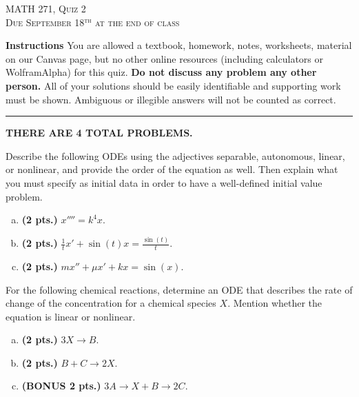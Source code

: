 \documentclass[12pt]{amsbook}
\begin{document}

\begin{center}
   \textsc{\large MATH 271, Quiz 2}\\
   \textsc{Due September 18$^\textrm{th}$ at the end of class}
\end{center}

\vspace{1cm}

\noindent\textbf{Instructions} \; You are allowed a textbook, homework, notes, worksheets, material on our Canvas page, but no other online resources (including calculators or WolframAlpha) for this quiz.  \textbf{Do not discuss any problem any other person.} All of your solutions should be easily identifiable and supporting work must be shown.  Ambiguous or illegible answers will not be counted as correct.


\vspace*{.5cm}
\hrule
\vspace*{.5cm}

\begin{center}\textbf{\large THERE ARE 4 TOTAL PROBLEMS.}\normalsize \end{center}

\begin{problem}
Describe the following ODEs using the adjectives separable, autonomous, linear, or nonlinear, and provide the order of the equation as well. Then explain what you must specify as initial data in order to have a well-defined initial value problem.
\begin{enumerate}[(a)]
	\item \textbf{(2 pts.)} $x'''' = k^4 x$.
	\item \textbf{(2 pts.)} $\frac{1}{t} x' + \sin(t) x = \frac{\sin(t)}{t}$.
	\item \textbf{(2 pts.)} $mx''+\mu x' + kx = \sin(x)$.
\end{enumerate}
\end{problem}

\begin{problem}
For the following chemical reactions, determine an ODE that describes the rate of change of the concentration for a chemical species $X$.  Mention whether the equation is linear or nonlinear.
\begin{enumerate}[(a)]
    \item \textbf{(2 pts.)} $3X \to B$.
    \item \textbf{(2 pts.)} $B+C \to 2X$.
    \item \textbf{(BONUS 2 pts.)} $3A\to X+B \to 2C$.
\end{enumerate}
\end{problem}
\end{document}
